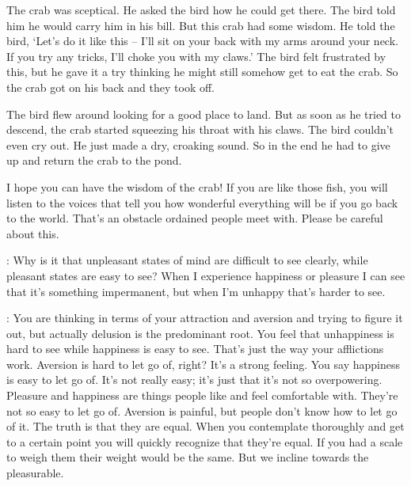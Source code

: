 The crab was sceptical. He asked the bird how he could get there. The bird told him he would carry him in his bill. But this crab had some wisdom. He told the bird, `Let's do it like this -- I'll sit on your back with my arms around your neck. If you try any tricks, I'll choke you with my claws.' The bird felt frustrated by this, but he gave it a try thinking he might still somehow get to eat the crab. So the crab got on his back and they took off. 

The bird flew around looking for a good place to land. But as soon as he tried to descend, the crab started squeezing his throat with his claws. The bird couldn't even cry out. He just made a dry, croaking sound. So in the end he had to give up and return the crab to the pond. 

I hope you can have the wisdom of the crab! If you are like those fish, you will listen to the voices that tell you how wonderful everything will be if you go back to the world. That's an obstacle ordained people meet with. Please be careful about this. 

: Why is it that unpleasant states of mind are difficult to see clearly, while pleasant states are easy to see? When I experience happiness or pleasure I can see that it's something impermanent, but when I'm unhappy that's harder to see. 

: You are thinking in terms of your attraction and aversion and trying to figure it out, but actually delusion is the predominant root. You feel that unhappiness is hard to see while happiness is easy to see. That's just the way your afflictions work. Aversion is hard to let go of, right? It's a strong feeling. You say happiness is easy to let go of. It's not really easy; it's just that it's not so overpowering. Pleasure and happiness are things people like and feel comfortable with. They're not so easy to let go of. Aversion is painful, but people don't know how to let go of it. The truth is that they are equal. When you contemplate thoroughly and get to a certain point you will quickly recognize that they're equal. If you had a scale to weigh them their weight would be the same. But we incline towards the pleasurable. 

